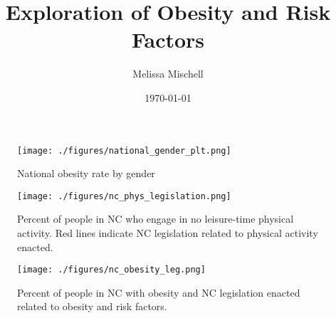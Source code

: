 \documentclass[11pt]{article}
\title{Exploration of Obesity and Risk Factors}
\author{Melissa Mischell}
\date{\today}
\begin{document}
\maketitle

\begin{figure}[h]
\texttt{[image: ./figures/national\_gender\_plt.png]}
\caption{National obesity rate by gender}
\label{fig:gender}
\end{figure}

\begin{figure}[h]
\texttt{[image: ./figures/nc\_phys\_legislation.png]}
\caption{
  Percent of people in NC who engage in no leisure-time physical activity. 
  Red lines indicate NC legislation related to physical activity enacted.
}
\label{fig:phys_act}
\end{figure}


\begin{figure}[h]
\texttt{[image: ./figures/nc\_obesity\_leg.png]}
\caption{
  Percent of people in NC with obesity and NC legislation enacted related to obesity and risk factors. 
}
\label{fig:nc_obesity}
\end{figure}
\end{document}
